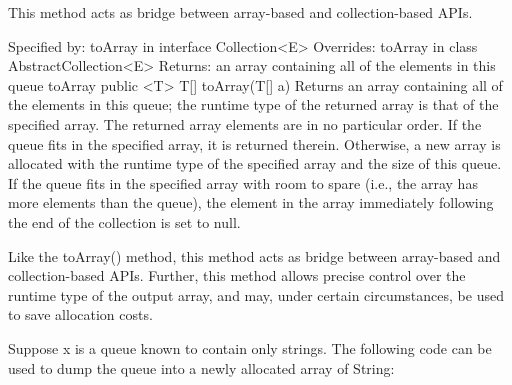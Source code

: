 \documentclass[babel]{book}
\begin{document}
This method acts as bridge between array-based and collection-based APIs.

Specified by:
toArray in interface Collection<E>
Overrides:
toArray in class AbstractCollection<E>
Returns:
an array containing all of the elements in this queue
toArray
public <T> T[] toArray(T[] a)
Returns an array containing all of the elements in this queue; the runtime type of the returned array is that of the specified array. The returned array elements are in no particular order. If the queue fits in the specified array, it is returned therein. Otherwise, a new array is allocated with the runtime type of the specified array and the size of this queue.
If the queue fits in the specified array with room to spare (i.e., the array has more elements than the queue), the element in the array immediately following the end of the collection is set to null.

Like the toArray() method, this method acts as bridge between array-based and collection-based APIs. Further, this method allows precise control over the runtime type of the output array, and may, under certain circumstances, be used to save allocation costs.

Suppose x is a queue known to contain only strings. The following code can be used to dump the queue into a newly allocated array of String:
\end{document}
